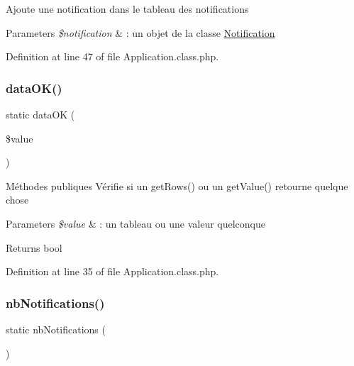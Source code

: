 Ajoute une notification dans le tableau des notifications 
\begin{DoxyParams}{Parameters}
{\em \$notification} & \+: un objet de la classe \hyperlink{class_notification}{Notification} \\
\hline
\end{DoxyParams}


Definition at line 47 of file Application.\+class.\+php.

\mbox{\label{class_application_a48315b63dbfa6a885a2de5b2576b72d4}} 
\subsubsection{\texorpdfstring{data\+O\+K()}{dataOK()}}
{\footnotesize\ttfamily static data\+OK (\begin{DoxyParamCaption}\item[{}]{\$value }\end{DoxyParamCaption})\hspace{0.3cm}{\ttfamily [static]}}

Méthodes publiques Vérifie si un get\+Rows() ou un get\+Value() retourne quelque chose 
\begin{DoxyParams}{Parameters}
{\em \$value} & \+: un tableau ou une valeur quelconque \\
\hline
\end{DoxyParams}
\begin{DoxyReturn}{Returns}
bool 
\end{DoxyReturn}


Definition at line 35 of file Application.\+class.\+php.

\mbox{\label{class_application_a1c75bfcfe281ca1155d3c5f6b99837ab}} 
\subsubsection{\texorpdfstring{nb\+Notifications()}{nbNotifications()}}
{\footnotesize\ttfamily static nb\+Notifications (\begin{DoxyParamCaption}{ }\end{DoxyParamCaption})\hspace{0.3cm}{\ttfamily [static]}}

